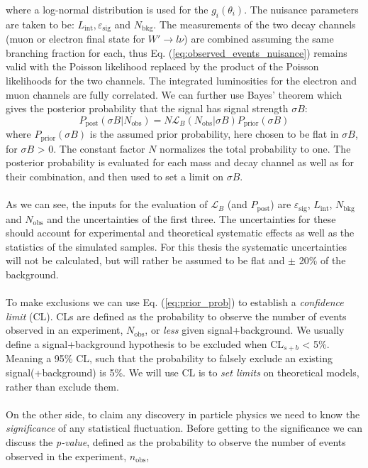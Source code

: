 \documentclass[12pt, a4paper]{book}
\begin{document}
where a log-normal distribution is used for the $g_i(\theta_i)$. The nuisance parameters are taken to be: $L_{\text{int}}, \varepsilon_{\text{sig}}$ and $N_{\text{bkg}}$. The measurements of 
the two decay channels (muon or electron final state for $W'\rightarrow l\nu$) are combined assuming the same branching fraction for each, thus Eq. (\ref{eq:observed_events_nuisance}) remains valid with the Poisson likelihood replaced by the product of the Poisson likelihoods for the two channels. 
The integrated luminosities for the electron and muon channels are fully correlated. We can further use Bayes' theorem which gives the posterior probability that the signal has signal strength $\sigma B$:
\begin{equation}\label{eq:prior_prob}
    P_{\text{post}}(\sigma B\vert N_{\text{obs}}) = N \mathcal{L}_B (N_{\text{obs}}\vert\sigma B) P_{\text{prior}}(\sigma B)
\end{equation}
where $P_{\text{prior}}(\sigma B)$ is the assumed prior probability, here chosen to be flat in $\sigma B$, for $\sigma B$ > 0. The constant factor $N$ normalizes the total probability to one. The posterior probability is evaluated for each mass and decay channel as well as for their 
combination, and then used to set a limit on $\sigma B$.\\
\\As we can see, the inputs for the evaluation of $\mathcal{L}_B$ (and $P_{\text{post}}$) are $\varepsilon_{\text{sig}}$, $L_{\text{int}}$, $N_{\text{bkg}}$ and $N_{\text{obs}}$ and the uncertainties of the first three. The uncertainties for these should account for experimental 
and theoretical systematic effects as well as the statistics of the simulated samples. For this thesis the systematic uncertainties will not be calculated, but will rather be assumed to be flat and $\pm$ 20\% of the background.\\
\\To make exclusions we can use Eq. (\ref{eq:prior_prob}) to establish a \textit{confidence limit} (CL). CLs are defined as the probability to observe the number of events observed in an experiment, $N_{\text{obs}}$, or \textit{less} given signal+background. We usually define a signal+background 
hypothesis to be excluded when CL$_{s+b}$ < 5\%. Meaning a 95\% CL, such that the probability to falsely exclude an existing signal(+background) is 5\%. We will use CL is to \textit{set limits} on theoretical models, rather than exclude them.\\
\\On the other side, to claim any discovery in particle physics we need to know the \textit{significance} of any statistical fluctuation. Before getting to the significance we can discuss the \textit{p-value}, defined as the probability to observe the number of events observed in the experiment, $n_{\text{obs}}$, 
\end{document}
